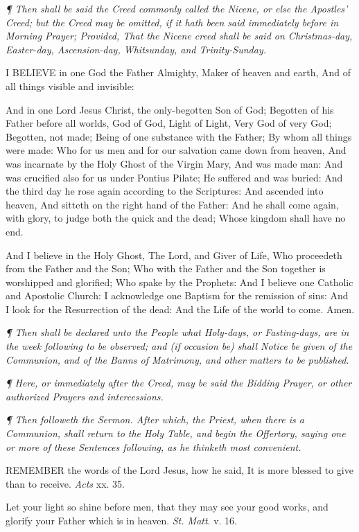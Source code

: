 \emph{¶ Then shall be said the Creed commonly called the Nicene, or
else the Apostles’ Creed; but the Creed may be omitted, if it hath
been said immediately before in Morning Prayer; Provided, That the Nicene
creed shall be said on Christmas-day, Easter-day, Ascension-day, Whitsunday,
and Trinity-Sunday.}

I
BELIEVE
in one God the Father Almighty, Maker of heaven and earth, And of all
things visible and invisible:

And in one Lord Jesus Christ, the only-begotten Son
of God; Begotten of his Father before all worlds, God of God, Light of
Light, Very God of very God; Begotten, not made; Being of one substance
with the Father; By whom all things were made: Who for us men and for
our salvation came down from heaven, And was incarnate by the Holy Ghost
of the Virgin Mary, And was made man: And was crucified also for us under
Pontius Pilate; He suffered and was buried: And the third day he rose
again according to the Scriptures: And ascended into heaven, And sitteth
on the right hand of the Father: And he shall come again, with glory,
to judge both the quick and the dead; Whose kingdom shall have no end.

And I believe in the Holy Ghost, The Lord, and Giver
of Life, Who proceedeth from the Father and the Son; Who with the Father
and the Son together is worshipped and glorified; Who spake by the Prophets:
And I believe one Catholic and Apostolic Church: I acknowledge one Baptism
for the remission of sins: And I look for the Resurrection of the dead:
And the Life of the world to come. Amen.

\emph{¶ Then shall be declared unto the People what Holy-days, or Fasting-days,
are in the week following to be observed; and (if occasion be) shall Notice
be given of the Communion, and of the Banns of Matrimony, and other matters
to be published.}

\emph{¶
Here, or immediately after the Creed, may be said the Bidding Prayer,
or other authorized Prayers and intercessions.}

\emph{¶
Then followeth the Sermon. After which, the Priest, when there is a Communion,
shall return to the Holy Table, and begin the Offertory, saying one or
more of these Sentences following, as he thinketh most convenient.}

REMEMBER
the words of the Lord Jesus, how he said, It is more blessed to give than
to receive. \emph{Acts} xx. 35.

Let your light so shine before men, that they may see
your good works, and glorify your Father which is in heaven. \emph{St.
Matt}. v. 16.

